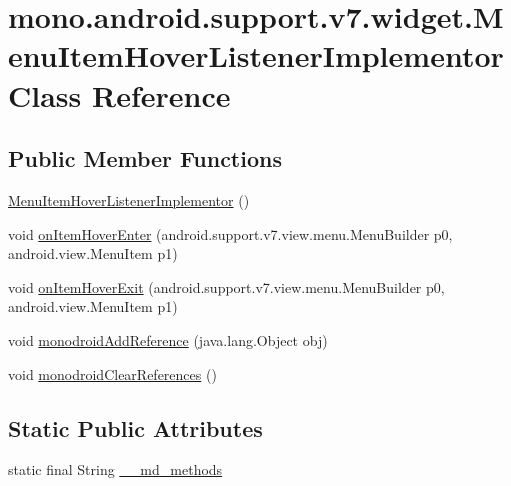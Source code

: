 \hypertarget{classmono_1_1android_1_1support_1_1v7_1_1widget_1_1_menu_item_hover_listener_implementor}{
\section{mono.android.support.v7.widget.MenuItemHoverListenerImplementor Class Reference}
\label{classmono_1_1android_1_1support_1_1v7_1_1widget_1_1_menu_item_hover_listener_implementor}
}
\subsection*{Public Member Functions}
\begin{CompactItemize}
\item 
\hyperlink{classmono_1_1android_1_1support_1_1v7_1_1widget_1_1_menu_item_hover_listener_implementor_f6d28098186fde573ac88f118bdab874}{MenuItemHoverListenerImplementor} ()
\item 
void \hyperlink{classmono_1_1android_1_1support_1_1v7_1_1widget_1_1_menu_item_hover_listener_implementor_fad93d8a57fc2c8063d02756cc5e05f3}{onItemHoverEnter} (android.support.v7.view.menu.MenuBuilder p0, android.view.MenuItem p1)
\item 
void \hyperlink{classmono_1_1android_1_1support_1_1v7_1_1widget_1_1_menu_item_hover_listener_implementor_76b4f45a652d7bded4b5303f6163098c}{onItemHoverExit} (android.support.v7.view.menu.MenuBuilder p0, android.view.MenuItem p1)
\item 
void \hyperlink{classmono_1_1android_1_1support_1_1v7_1_1widget_1_1_menu_item_hover_listener_implementor_bd21a3c57e8c6923ad5e761a20cd4912}{monodroidAddReference} (java.lang.Object obj)
\item 
void \hyperlink{classmono_1_1android_1_1support_1_1v7_1_1widget_1_1_menu_item_hover_listener_implementor_548908820e48dd5c76dfbf565d702c4c}{monodroidClearReferences} ()
\end{CompactItemize}
\subsection*{Static Public Attributes}
\begin{CompactItemize}
\item 
static final String \hyperlink{classmono_1_1android_1_1support_1_1v7_1_1widget_1_1_menu_item_hover_listener_implementor_73a796ddc43d5f81a5967a791026a58b}{\_\-\_\-md\_\-methods}
\end{CompactItemize}
